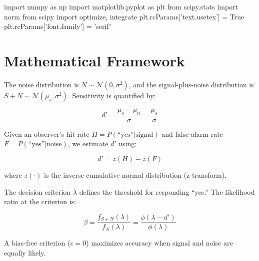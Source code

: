 \documentclass[11pt,a4paper]{article}
\begin{document}
\begin{pycode}

import numpy as np
import matplotlib.pyplot as plt
from scipy.stats import norm
from scipy import optimize, integrate
plt.rcParams['text.usetex'] = True
plt.rcParams['font.family'] = 'serif'

\end{pycode}

\section{Mathematical Framework}

The noise distribution is $N \sim \mathcal{N}(0, \sigma^2)$, and the signal-plus-noise distribution is $S+N \sim \mathcal{N}(\mu_s, \sigma^2)$. Sensitivity is quantified by:

\begin{equation}
d' = \frac{\mu_s - \mu_n}{\sigma} = \frac{\mu_s}{\sigma}
\end{equation}

Given an observer's hit rate $H = P(\text{``yes''} | \text{signal})$ and false alarm rate $F = P(\text{``yes''} | \text{noise})$, we estimate $d'$ using:

\begin{equation}
d' = z(H) - z(F)
\end{equation}

where $z(\cdot)$ is the inverse cumulative normal distribution (z-transform).

The decision criterion $\lambda$ defines the threshold for responding ``yes.'' The likelihood ratio at the criterion is:

\begin{equation}
\beta = \frac{f_{S+N}(\lambda)}{f_N(\lambda)} = \frac{\phi(\lambda - d')}{\phi(\lambda)}
\end{equation}

A bias-free criterion ($c = 0$) maximizes accuracy when signal and noise are equally likely.
\end{document}
